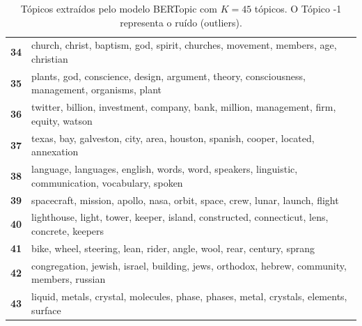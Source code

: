 \begin{table}[htpb]
\begin{tabularx}{\textwidth}{@{}l X@{}}
        \textbf{34} & church, christ, baptism, god, spirit, churches, movement, members, age, christian \\
        \textbf{35} & plants, god, conscience, design, argument, theory, consciousness, management, organisms, plant \\
        \textbf{36} & twitter, billion, investment, company, bank, million, management, firm, equity, watson \\
        \textbf{37} & texas, bay, galveston, city, area, houston, spanish, cooper, located, annexation \\
        \textbf{38} & language, languages, english, words, word, speakers, linguistic, communication, vocabulary, spoken \\
        \textbf{39} & spacecraft, mission, apollo, nasa, orbit, space, crew, lunar, launch, flight \\
        \textbf{40} & lighthouse, light, tower, keeper, island, constructed, connecticut, lens, concrete, keepers \\
        \textbf{41} & bike, wheel, steering, lean, rider, angle, wool, rear, century, sprang \\
        \textbf{42} & congregation, jewish, israel, building, jews, orthodox, hebrew, community, members, russian \\
        \textbf{43} & liquid, metals, crystal, molecules, phase, phases, metal, crystals, elements, surface \\
        \bottomrule
    \end{tabularx}
    \caption{Tópicos extraídos pelo modelo BERTopic com $K=45$ tópicos. O Tópico -1 representa o ruído (outliers).}
    \label{tab:topicos_bertopic_45}
\end{table}
